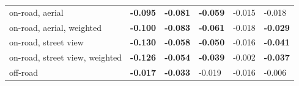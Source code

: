\begin{table}[hbt!]
\begin{tabular}{l*{5}{l}}
\midrule
on-road, aerial & \cellcolor{negcell}\textbf{-0.095} & \cellcolor{negcell}\textbf{-0.081} & \cellcolor{negcell}\textbf{-0.059} & -0.015 & -0.018 \\
on-road, aerial, weighted & \cellcolor{negcell}\textbf{-0.100} & \cellcolor{negcell}\textbf{-0.083} & \cellcolor{negcell}\textbf{-0.061} & -0.018 & \cellcolor{negcell}\textbf{-0.029} \\
on-road, street view & \cellcolor{negcell}\textbf{-0.130} & \cellcolor{negcell}\textbf{-0.058} & \cellcolor{negcell}\textbf{-0.050} & -0.016 & \cellcolor{negcell}\textbf{-0.041} \\
on-road, street view, weighted & \cellcolor{negcell}\textbf{-0.126} & \cellcolor{negcell}\textbf{-0.054} & \cellcolor{negcell}\textbf{-0.039} & -0.002 & \cellcolor{negcell}\textbf{-0.037} \\
off-road & \cellcolor{negcell}\textbf{-0.017} & \cellcolor{negcell}\textbf{-0.033} & -0.019 & -0.016 & -0.006 \\
\bottomrule
\end{tabular}
\end{table}
